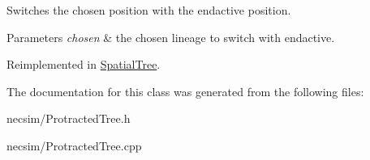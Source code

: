 Switches the chosen position with the endactive position. 


\begin{DoxyParams}{Parameters}
{\em chosen} & the chosen lineage to switch with endactive. \\
\hline
\end{DoxyParams}


Reimplemented in \hyperlink{class_spatial_tree_a71c99204503ec59815a5338ab934331d}{Spatial\+Tree}.



The documentation for this class was generated from the following files\+:\begin{DoxyCompactItemize}
\item 
necsim/Protracted\+Tree.\+h\item 
necsim/Protracted\+Tree.\+cpp\end{DoxyCompactItemize}
